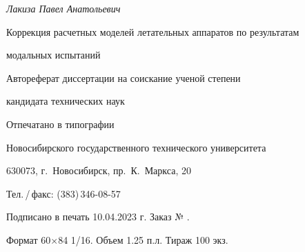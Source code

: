 
\newpage
\thispagestyle{empty}
\vspace*{0pt plus1fill}
\begin{center}
    \textit{Лакиза Павел Анатольевич}
    \par\smallskip

    Коррекция расчетных моделей летательных аппаратов 
    по результатам \par модальных испытаний
    \par\smallskip

    Автореферат диссертации на соискание ученой степени \par
    кандидата технических наук
    \par\medskip
    
    Отпечатано в типографии \par
    Новосибирского государственного технического университета \par   
    630073, г.~Новосибирск, пр.~К.~Маркса, 20 \par
    Тел.\,/\,факс: (383)\,346-08-57 \par
    Подписано в печать 10.04.2023 г. Заказ № . \par
    Формат 60$\times$84 1/16. Объем 1.25 п.л. Тираж 100 экз.
\end{center}